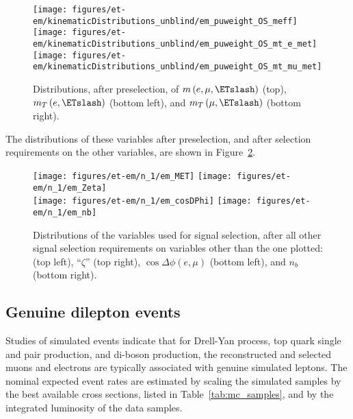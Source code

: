 \begin{figure}\centering
  \texttt{[image: figures/et-em/kinematicDistributions\_unblind/em\_puweight\_OS\_meff]} \\
  \texttt{[image: figures/et-em/kinematicDistributions\_unblind/em\_puweight\_OS\_mt\_e\_met]}
  \texttt{[image: figures/et-em/kinematicDistributions\_unblind/em\_puweight\_OS\_mt\_mu\_met]}
  \caption{\label{fig:em_preselection_distributions3} Distributions,
    after \tetm preselection, of $m\left(e, \mu, \ETslash\right)$
    (top), $m_{T}\left(e, \ETslash\right)$ (bottom left), and
    $m_{T}\left(\mu, \ETslash\right)$ (bottom right).}
\end{figure}

The distributions of these variables after preselection, and after
selection requirements on the other variables, are shown in
Figure~\ref{fig:em_nm1_distributions}.

\begin{figure}\centering
  \texttt{[image: figures/et-em/n\_1/em\_MET]}
  \texttt{[image: figures/et-em/n\_1/em\_Zeta]} \\
  \texttt{[image: figures/et-em/n\_1/em\_cosDPhi]}
  \texttt{[image: figures/et-em/n\_1/em\_nb]}
  \caption{\label{fig:em_nm1_distributions} Distributions of the
    variables used for \tetm signal selection, after all other signal
    selection requirements on variables other than the one plotted:
    \ETslash (top left), ``$\zeta$'' (top right), $\cos{\Delta \phi
      (e,\mu)}$ (bottom left), and $n_b$ (bottom right).}
\end{figure}

\subsection{Genuine dilepton events}
Studies of simulated events indicate that for Drell-Yan process, top
quark single and pair production, and di-boson production, the
reconstructed and selected muons and electrons are typically
associated with genuine simulated leptons.  The nominal expected event
rates are estimated by scaling the simulated samples by the best
available cross sections, listed in Table~\ref{tab:mc_samples}, and by
the integrated luminosity of the data samples.

